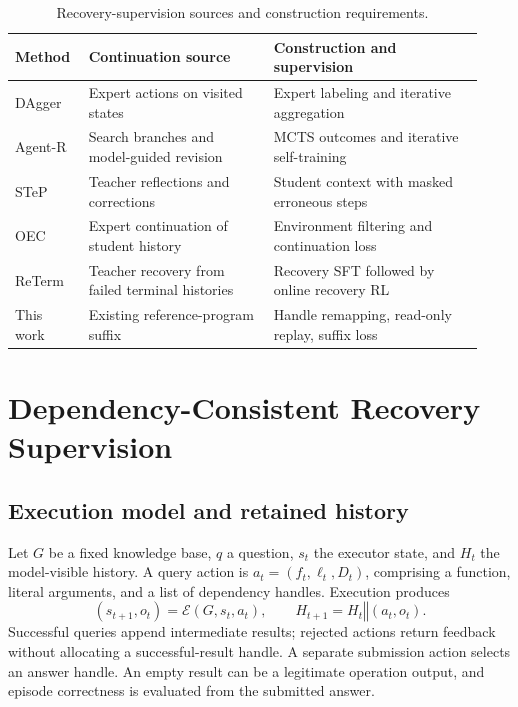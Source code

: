 \documentclass[a4paper,12pt]{article}
\begin{document}
\begin{table}[htbp]
 \centering
 \caption{Recovery-supervision sources and construction requirements.}
 \label{tab:related}
 \begin{tabular}{@{}p{0.14\linewidth}p{0.37\linewidth}p{0.42\linewidth}@{}}
\toprule
Method & Continuation source & Construction and supervision \\
\midrule
DAgger & Expert actions on visited states & Expert labeling and iterative aggregation \\
Agent-R & Search branches and model-guided revision & MCTS outcomes and iterative self-training \\
STeP & Teacher reflections and corrections & Student context with masked erroneous steps \\
OEC & Expert continuation of student history & Environment filtering and continuation loss \\
ReTerm & Teacher recovery from failed terminal histories & Recovery SFT followed by online recovery RL \\
This work & Existing reference-program suffix & Handle remapping, read-only replay, suffix loss \\
\bottomrule
\end{tabular}
\end{table}

\section{Dependency-Consistent Recovery Supervision}

\subsection{Execution model and retained history}

Let $G$ be a fixed knowledge base, $q$ a question, $s_t$ the executor state, and $H_t$ the model-visible history. A query action is $a_t=(f_t,\ell_t,D_t)$, comprising a function, literal arguments, and a list of dependency handles. Execution produces
\begin{equation}
 (s_{t+1},o_t)=\mathcal{E}(G,s_t,a_t),\qquad
 H_{t+1}=H_t\mathbin{\Vert}(a_t,o_t).
\end{equation}
Successful queries append intermediate results; rejected actions return feedback without allocating a successful-result handle. A separate submission action selects an answer handle. An empty result can be a legitimate operation output, and episode correctness is evaluated from the submitted answer.
\end{document}
